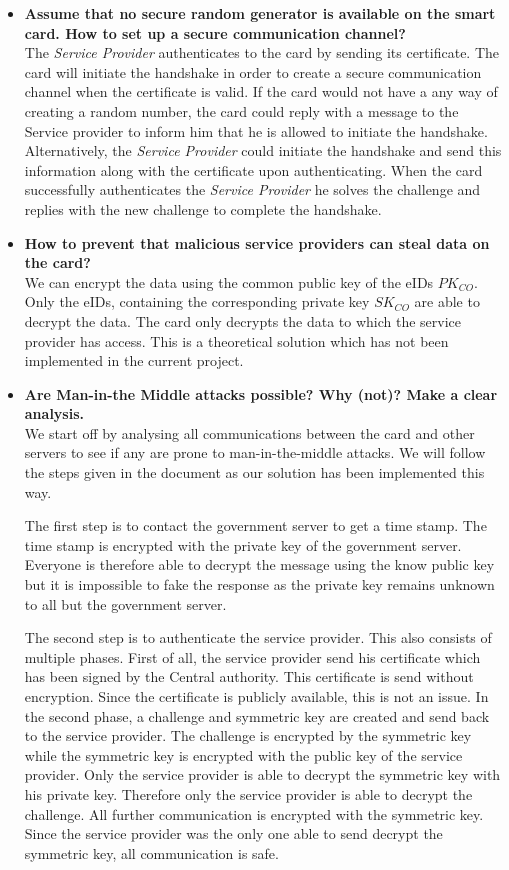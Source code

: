 \documentclass[12pt]{report}
\begin{document}
\begin{itemize}
\item \textbf{Assume that no secure random generator is available on the smart card. How to set up a secure communication channel?}\\
The \textit{Service Provider} authenticates to the card by sending its certificate. The card will initiate the handshake in order to create a secure communication channel when the certificate is valid. If the card would not have a any way of creating a random number, the card could reply with a message to the Service provider to inform him that he is allowed to initiate the handshake. Alternatively, the \textit{Service Provider} could initiate the handshake and send this information along with the certificate upon authenticating. When the card successfully authenticates the \textit{Service Provider} he solves the challenge and replies with the new challenge to complete the handshake.

\item \textbf{How to prevent that malicious service providers can steal data on the card?}\\
We can encrypt the data using the common public key of the eIDs $PK_{CO}$. Only the eIDs, containing the corresponding private key $SK_{CO}$ are able to decrypt the data. The card only decrypts the data to which the service provider has access. This is a theoretical solution which has not been implemented in the current project.

\item \textbf{Are Man-in-the Middle attacks possible? Why (not)? Make a clear analysis.}\\
We start off by analysing all communications between the card and other servers to see if any are prone to man-in-the-middle attacks. We will follow the steps given in the document as our solution has been implemented this way.

The first step is to contact the government server to get a time stamp. The time stamp is encrypted with the private key of the government server. Everyone is therefore able to decrypt the message using the know public key but it is impossible to fake the response as the private key remains unknown to all but the government server.

The second step is to authenticate the service provider. This also consists of multiple phases. First of all, the service provider send his certificate which has been signed by the Central authority. This certificate is send without encryption. Since the certificate is publicly available, this is not an issue.
In the second phase, a challenge and symmetric key are created and send back to the service provider. The challenge is encrypted by the symmetric key while the symmetric key is encrypted with the public key of the service provider. Only the service provider is able to decrypt the symmetric key with his private key. Therefore only the service provider is able to decrypt the challenge. All further communication is encrypted with the symmetric key. Since the service provider was the only one able to send decrypt the symmetric key, all communication is safe.


\end{itemize}
\end{document}
